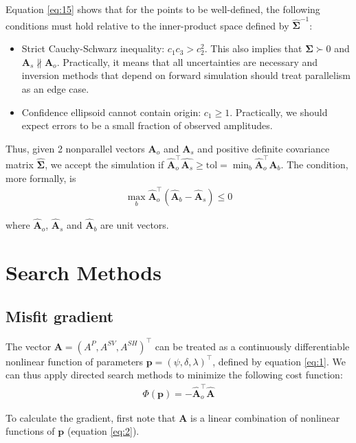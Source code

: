 \documentclass[preprint]{seismica}
\begin{document}
    Equation \ref{eq:15} shows that for the points to be well-defined, the following conditions
    must hold relative to the inner-product space defined by $\hat{\bm{\Sigma}}^{-1}$:
    
    \begin{itemize}
      \item Strict Cauchy-Schwarz inequality: $c_1c_3 > c_2^2$. This also implies that
        $\hat{\bm{\Sigma}} \succ 0$ and $\bm{A}_s \nparallel \bm{A}_o$. Practically, it means that all
        uncertainties are necessary and inversion methods that depend on forward simulation should
        treat parallelism as an edge case.
      \item Confidence ellipsoid cannot contain origin: $c_1 \geq 1$. Practically, we should expect
      errors to be a small fraction of observed amplitudes.
    \end{itemize}

    Thus, given 2 nonparallel vectors $\bm{A}_o$ and $\bm{A}_s$ and positive definite covariance
    matrix $\hat{\bm{\Sigma}}$, we accept the simulation if $\hat{\bm{A}}_o^\top \hat{\bm{A}_s} \geq \text{tol} 
    = \min_b \hat{\bm{A}}_o^\top \hat{\bm{A}_b}$. The condition, more formally, is
    \begin{align} \label{eq:16}
      \max_b \hat{\bm{A}}_o^\top (\hat{\bm{A}}_b - \hat{\bm{A}}_s) \leq 0
    \end{align}

    \noindent where $\hat{\bm{A}}_o$, $\hat{\bm{A}}_s$ and $\hat{\bm{A}}_b$ are unit vectors.


\section{Search Methods} \label{sec:algorithms}
  
  \subsection{Misfit gradient}
    The vector $\bm{A} = (A^P, A^{SV}, A^{SH})^\top$ can be treated as a continuously differentiable 
    nonlinear function of parameters $\bm{p} = (\psi, \delta, \lambda)^\top$, defined by equation 
    \ref{eq:1}. We can thus apply directed search methods to minimize the following cost function:
    \begin{align} \label{eq:17}
      \Phi(\bm{p}) = -\hat{\bm{A}}_o^\top \hat{\bm{A}}
    \end{align}

    To calculate the gradient, first note that $\bm{A}$ is a linear combination of nonlinear functions
    of $\bm{p}$ (equation \ref{eq:2}).
\end{document}
